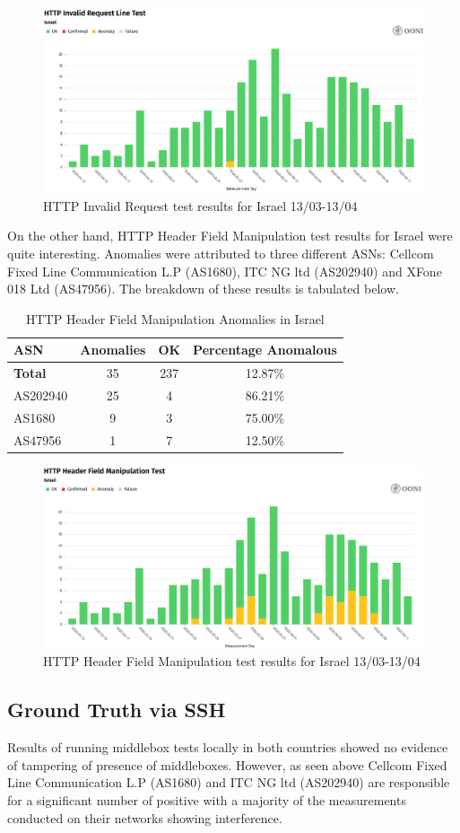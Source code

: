 \begin{figure} [H]
    \centering
    \includegraphics[width=0.5\linewidth]{ISROONIDBMB1.png}
    \caption{HTTP Invalid Request test results for Israel 13/03-13/04}
    \label{fig:enter-label}
\end{figure}

On the other hand, HTTP Header Field Manipulation test results for Israel were quite interesting. Anomalies were attributed to three different ASNs: Cellcom Fixed Line Communication L.P (AS1680), ITC NG ltd (AS202940) and XFone 018 Ltd (AS47956). The breakdown of these results is tabulated below.

\begin{table}[H]
\centering
\caption{HTTP Header Field Manipulation Anomalies in Israel}
\begin{tabular}{lccc}
\toprule
\textbf{ASN} & \textbf{Anomalies} & \textbf{OK} & \textbf{Percentage Anomalous} \\
\midrule
\textbf{Total}       & 35 & 237 & 12.87\% \\
\midrule
AS202940             & 25 & 4   & 86.21\% \\
AS1680               & 9  & 3   & 75.00\% \\
AS47956              & 1  & 7   & 12.50\% \\
\bottomrule
\end{tabular}
\label{tab:http_header_israel}
\end{table}


\begin{figure} [H]
    \centering
    \includegraphics[width=0.5\linewidth]{ISROONIDBMB2.png}
    \caption{HTTP Header Field Manipulation test results for Israel 13/03-13/04}
    \label{fig:enter-label}
\end{figure}

\subsection{Ground Truth via SSH}
Results of running middlebox tests locally in both countries showed no evidence of tampering of presence of middleboxes. However, as seen above Cellcom Fixed Line Communication L.P (AS1680) and ITC NG ltd (AS202940) are responsible for a significant number of positive with a majority of the measurements conducted on their networks showing interference. 

